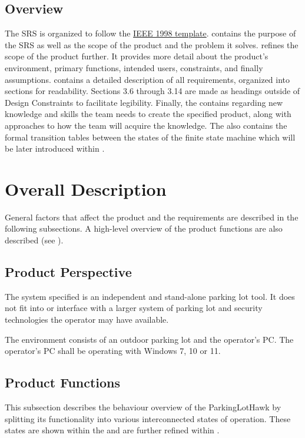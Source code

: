 \documentclass{article}
\begin{document}
\subsection{Overview}
The SRS is organized to follow the \href{https://github.com/icecap360/DroneCapstone/blob/master/refs/IEEE1998.pdf}{IEEE 1998 template}.  contains the purpose of the SRS as well as the scope of the product and the problem it solves.   refines the scope of the product further. It provides more detail about the product's environment, primary functions, intended users, constraints, and finally assumptions.  contains a detailed description of all requirements, organized into sections for readability. Sections 3.6 through 3.14 are made as headings outside of Design Constraints to facilitate legibility. Finally, the  contains  regarding new knowledge and skills the team needs to create the specified product, along with approaches to how the team will acquire the knowledge. The   also contains the formal transition tables between the states of the finite state machine which will be later introduced within .
\section{Overall Description}
\label{sec:Desc}
General factors that affect the product and the requirements are described in the following subsections. A high-level overview of the product functions are also described (see ). 
\subsection{Product Perspective}
The system specified is an independent and stand-alone parking lot tool. It does not fit into or interface with a larger system of parking lot and security technologies the operator may have available. 

The environment consists of an outdoor parking lot and the operator's PC. The operator's PC shall be operating with Windows 7, 10 or 11.

\subsection{Product Functions}
\label{subsec:ProdFunc}
This subsection describes the behaviour overview of the ParkingLotHawk by splitting its functionality into various interconnected states of operation. These states are shown within the  and are further refined within . 
\end{document}
